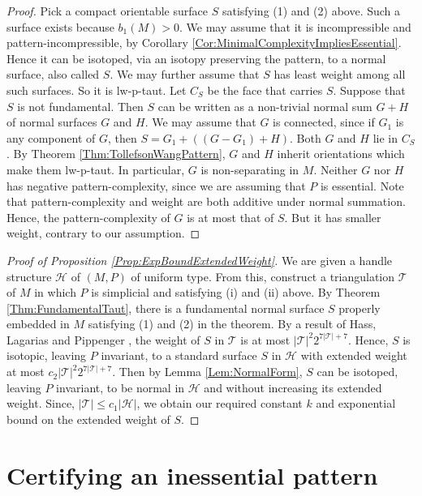 \documentclass[oneside]{amsart}
\numberwithin{equation}{section}
\theoremstyle{plain}
\theoremstyle{definition}
\begin{document}
\begin{proof}
Pick a compact orientable surface $S$ satisfying (1) and (2) above. Such a surface exists because $b_1(M)>0$.
We may assume that it is incompressible and pattern-incompressible, by Corollary \ref{Cor:MinimalComplexityImpliesEssential}. Hence it can be isotoped, via an isotopy preserving the pattern, to a normal surface, also called $S$. We may further assume that $S$ has least weight among all such surfaces. So it is lw-p-taut. Let $C_{S}$ be the face that carries $S$. Suppose that $S$ is not fundamental. Then $S$ can be written as a non-trivial normal sum $G+ H$ of normal surfaces $G$ and $H$. We may assume that $G$ is connected, since if $G_1$ is any component of $G$, then $S = G_1 + ((G-G_1) + H)$. Both $G$ and $H$ lie in $C_S$. By Theorem \ref{Thm:TollefsonWangPattern}, $G$ and $H$ inherit orientations which make them lw-p-taut. In particular, $G$ is non-separating in $M$. Neither $G$ nor $H$ has negative pattern-complexity, since we are assuming that $P$ is essential. Note that pattern-complexity and weight are both additive under normal summation. Hence, the pattern-complexity of $G$ is at most that of $S$. But it has smaller weight, contrary to our assumption.
\end{proof}

\begin{proof}[Proof of Proposition \ref{Prop:ExpBoundExtendedWeight}]
We are given a handle structure $\mathcal{H}$ of $(M,P)$ of uniform type. From this, construct a triangulation $\mathcal{T}$ of $M$
in which $P$ is simplicial and satisfying (i) and (ii) above. By Theorem \ref{Thm:FundamentalTaut}, there is a fundamental normal surface $S$ properly embedded in $M$
satisfying (1) and (2) in the theorem. By a result of Hass, Lagarias and Pippenger \cite[Lemma 6.1]{HassLagariasPippenger}, the weight of $S$ in $\mathcal{T}$
is at most $|\mathcal{T}|^2 2^{7|\mathcal{T}|+7}$. Hence, $S$ is isotopic, leaving $P$ invariant, to a standard surface $S$ in $\mathcal{H}$
with extended weight at most $c_2 |\mathcal{T}|^2 2^{7|\mathcal{T}|+7}$. Then by Lemma \ref{Lem:NormalForm}, $S$ can be isotoped, leaving $P$ invariant, 
to be normal
in $\mathcal{H}$ and without increasing its extended weight. Since, $|\mathcal{T}| \leq c_1 |\mathcal{H}|$, we obtain our required constant $k$ and exponential bound
on the extended weight of $S$.
\end{proof}

\section{Certifying an inessential pattern}
\label{Sec:CertifyingInessential}
\end{document}
